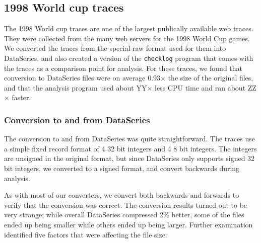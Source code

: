 \subsection{1998 World cup traces}\label{sec:world-cup-1998}

The 1998 World cup traces\cite{ita08} are one of the largest
publically available web traces.  They were collected from the many
web servers for the 1998 World Cup games.  We converted the traces
from the special raw format used for them into DataSeries, and also
created a version of the {\tt checklog} program that comes with the
traces as a comparison point for analysis.  For these traces, we found
that conversion to DataSeries files were on average 0.93$\times$ the
size of the original files, and that the analysis program used about
YY$\times$ less CPU time and ran about ZZ$\times$ faster.

\subsubsection{Conversion to and from DataSeries}

The conversion to and from DataSeries was quite straightforward.  The
traces use a simple fixed record format of 4 32 bit integers and 4 8
bit integers.  The integers are unsigned in the original format, but
since DataSeries only supports signed 32 bit integers, we converted
to a signed format, and convert backwards during analysis.  

As with most of our converters, we convert both backwards and forwards
to verify that the conversion was correct.  The conversion results
turned out to be very strange; while overall DataSeries compressed 2\%
better, some of the files ended up being smaller while others ended up
being larger.  Further examination identified five factors that were 
affecting the file size:

